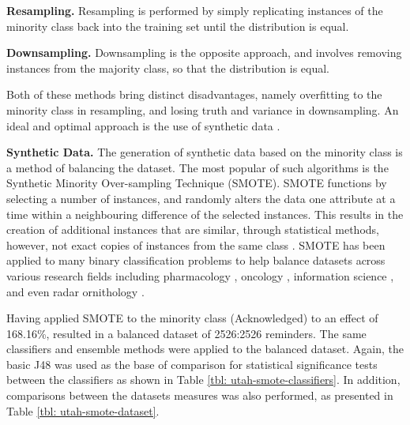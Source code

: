 \textbf{Resampling.}
Resampling is performed by simply replicating instances of the minority class back into the training set until the distribution is equal. 

\textbf{Downsampling.}
Downsampling is the opposite approach, and involves removing instances from the majority class, so that the distribution is equal. 

Both of these methods bring distinct disadvantages, namely overfitting to the minority class in resampling, and losing truth and variance in downsampling. An ideal and optimal approach is the use of synthetic data \cite{nonnemaker2008}.

\textbf{Synthetic Data.} The generation of synthetic data based on the minority class is a method of balancing the dataset. The most popular of such algorithms is the Synthetic Minority Over-sampling Technique (SMOTE). SMOTE functions by selecting a number of instances, and randomly alters the data one attribute at a time within a neighbouring difference of the selected instances. This results in the creation of additional instances that are similar, through statistical methods, however, not exact copies of instances from the same class \cite{Chawla2011}. SMOTE has been applied to many binary classification problems to help balance datasets across various research fields including pharmacology \cite{Kumari2015}, oncology \cite{Fehr2015}, information science \cite{Cleland2014-IWAAL, Zhang2013}, and even radar ornithology \cite{D.Rosa2016}.

Having applied SMOTE to the minority class (Acknowledged) to an effect of 168.16\%, resulted in a balanced dataset of 2526:2526 reminders.  
The same classifiers and ensemble methods were applied to the balanced dataset. Again, the basic J48 was used as the base of comparison for statistical significance tests between the classifiers as shown in Table \ref{tbl: utah-smote-classifiers}. In addition, comparisons between the datasets measures was also performed, as presented in Table \ref{tbl: utah-smote-dataset}.

